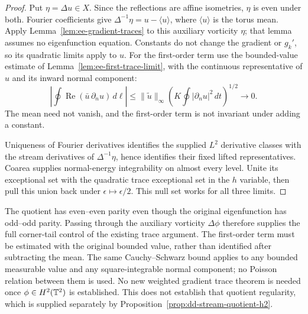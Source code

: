 \begin{proof}
\leanok
Put $\eta=\Delta u\in X$. Since the reflections are affine isometries,
$\eta$ is even under both. Fourier coefficients give
$\Delta^{-1}\eta=u-\langle u\rangle$, where $\langle u\rangle$ is the torus
mean. Apply Lemma~\ref{lem:ee-gradient-traces} to this auxiliary vorticity
$\eta$; that lemma assumes no eigenfunction equation. Constants do not
change the gradient or $g_k'$, so its quadratic limits apply to $u$.
For the first-order term use the bounded-value estimate of
Lemma~\ref{lem:ee-first-trace-limit}, with the continuous representative of
$u$ and its inward normal component:
\[
 \left|\oint\operatorname{Re}(\bar u\,\partial_nu)\,d\ell\right|
 \le \|\tilde u\|_\infty
       \left(K\oint|\partial_nu|^2\,dt\right)^{1/2}\longrightarrow0.
\]
The mean need not vanish, and the first-order term is not invariant under
adding a constant.

Uniqueness of Fourier derivatives identifies the supplied $L^2$ derivative
classes with the stream derivatives of $\Delta^{-1}\eta$, hence identifies
their fixed lifted representatives. Coarea supplies normal-energy integrability
on almost every level. Unite its exceptional set with the quadratic trace
exceptional set in the $h$ variable, then pull this union back under
$\epsilon\mapsto\epsilon/2$. This null set works for all three limits.
\end{proof}

\begin{remark}
The quotient has even--even parity even though the original eigenfunction
has odd--odd parity. Passing through the auxiliary vorticity $\Delta\phi$
therefore supplies the full corner-tail control of the existing trace
argument. The first-order term must be estimated with the original bounded
value, rather than identified after subtracting the mean. The same
Cauchy--Schwarz bound applies to any bounded measurable value and any
square-integrable normal component; no Poisson relation between them is used.
No new weighted gradient trace theorem is needed once
$\phi\in H^2(\mathbb{T}^2)$ is established. This does not establish that quotient
regularity, which is supplied separately by
Proposition~\ref{prop:dd-stream-quotient-h2}.
\end{remark}

